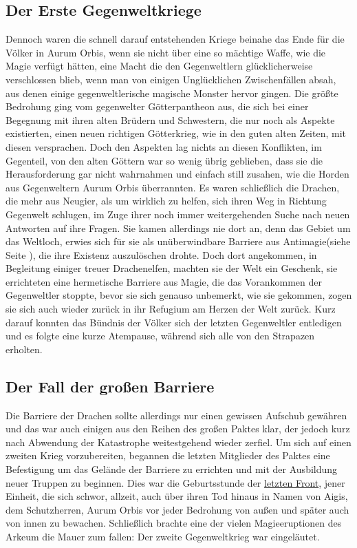 \documentclass[a4paper,12pt,oneside]{book}
\begin{document}
\subsection{Der Erste Gegenweltkriege}
Dennoch waren die schnell darauf entstehenden Kriege beinahe das Ende für die Völker in Aurum Orbis, wenn sie nicht über eine so mächtige Waffe, wie die Magie verfügt hätten, eine Macht die den Gegenweltlern glücklicherweise verschlossen blieb, wenn man von einigen Unglücklichen Zwischenfällen absah, aus denen einige gegenweltlerische magische Monster hervor gingen. Die größte Bedrohung ging vom gegenwelter Götterpantheon aus, die sich bei einer Begegnung mit ihren alten Brüdern und Schwestern, die nur noch als Aspekte existierten, einen neuen richtigen Götterkrieg, wie in den guten alten Zeiten, mit diesen versprachen. Doch den Aspekten lag nichts an diesen Konflikten, im Gegenteil, von den alten Göttern war so wenig übrig geblieben, dass sie die Herausforderung gar nicht wahrnahmen und einfach still zusahen, wie die Horden aus Gegenweltern Aurum Orbis überrannten. Es waren schließlich die Drachen, die mehr aus Neugier, als um wirklich zu helfen, sich ihren Weg in Richtung Gegenwelt schlugen, im Zuge ihrer noch immer weitergehenden Suche nach neuen Antworten auf ihre Fragen. Sie kamen allerdings nie dort an, denn das Gebiet um das Weltloch, erwies sich für sie als unüberwindbare Barriere aus Antimagie(siehe Seite \pageref{Antimagie}), die ihre Existenz auszulöschen drohte. Doch dort angekommen, in Begleitung einiger treuer Drachenelfen, machten sie der Welt ein Geschenk, sie errichteten eine hermetische Barriere aus Magie, die das Vorankommen der Gegenweltler stoppte, bevor sie sich genauso unbemerkt, wie sie gekommen, zogen sie sich auch wieder zurück in ihr Refugium am Herzen der Welt zurück. Kurz darauf konnten das Bündnis der Völker sich der letzten Gegenweltler entledigen und es folgte eine kurze Atempause, während sich alle von den Strapazen erholten.

\subsection{Der Fall der großen Barriere}
Die Barriere der Drachen sollte allerdings nur einen gewissen Aufschub gewähren und das war auch einigen aus den Reihen des großen Paktes klar, der jedoch kurz nach Abwendung der Katastrophe weitestgehend wieder zerfiel. Um sich auf einen zweiten Krieg vorzubereiten, begannen die letzten Mitglieder des Paktes eine Befestigung um das Gelände der Barriere zu errichten und mit der Ausbildung neuer Truppen zu beginnen. Dies war die Geburtsstunde der \uline{letzten Front}, jener Einheit, die sich schwor, allzeit, auch über ihren Tod hinaus in Namen von Aigis, dem Schutzherren, Aurum Orbis vor jeder Bedrohung von außen und später auch von innen zu bewachen. Schließlich brachte eine der vielen Magieeruptionen des Arkeum die Mauer zum fallen: Der zweite Gegenweltkrieg war eingeläutet.
\end{document}
